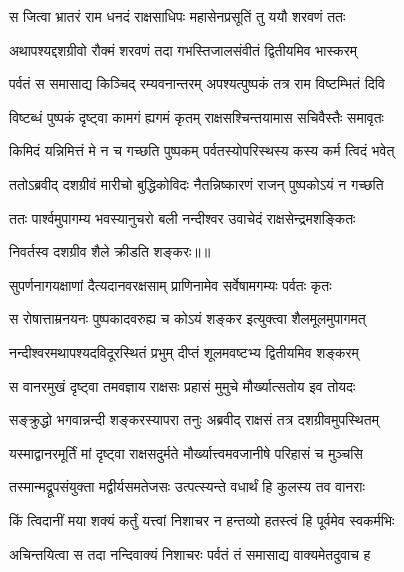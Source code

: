 
\twolineshloka
{स जित्वा भ्रातरं राम धनदं राक्षसाधिपः}
{महासेनप्रसूतिं तु ययौ शरवणं ततः} %

\twolineshloka
{अथापश्यद्दशग्रीवो रौक्मं शरवणं तदा}
{गभस्तिजालसंवीतं द्वितीयमिव भास्करम्} %

\twolineshloka
{पर्वतं स समासाद्य किञ्चिद् रम्यवनान्तरम्}
{अपश्यत्पुष्पकं तत्र राम विष्टम्भितं दिवि} %

\twolineshloka
{विष्टब्धं पुष्पकं दृष्ट्वा कामगं ह्यगमं कृतम्}
{राक्षसश्चिन्तयामास सचिवैस्तैः समावृतः} %

\twolineshloka
{किमिदं यन्निमित्तं मे न च गच्छति पुष्पकम्}
{पर्वतस्योपरिस्थस्य कस्य कर्म त्विदं भवेत्} %

\twolineshloka
{ततोऽब्रवीद् दशग्रीवं मारीचो बुद्धिकोविदः}
{नैतन्निष्कारणं राजन् पुष्पकोऽयं न गच्छति} %

\twolineshloka
{ततः पार्श्वमुपागम्य भवस्यानुचरो बली}
{नन्दीश्वर उवाचेदं राक्षसेन्द्रमशङ्कितः} %

{निवर्तस्व दशग्रीव शैले क्रीडति शङ्करः॥॥} %

\addtocounter{shlokacount}{1}

\twolineshloka
{सुपर्णनागयक्षाणां दैत्यदानवरक्षसाम्}
{प्राणिनामेव सर्वेषामगम्यः पर्वतः कृतः} %

\twolineshloka
{स रोषात्ताम्रनयनः पुष्पकादवरुह्य च}
{कोऽयं शङ्कर इत्युक्त्वा शैलमूलमुपागमत्} %

\twolineshloka
{नन्दीश्वरमथापश्यदविदूरस्थितं प्रभुम्}
{दीप्तं शूलमवष्टभ्य द्वितीयमिव शङ्करम्} %

\twolineshloka
{स वानरमुखं दृष्ट्वा तमवज्ञाय राक्षसः}
{प्रहासं मुमुचे मौर्ख्यात्सतोय इव तोयदः} %

\twolineshloka
{सङ्क्रुद्धो भगवान्नन्दी शङ्करस्यापरा तनुः}
{अब्रवीद् राक्षसं तत्र दशग्रीवमुपस्थितम्} %

\twolineshloka
{यस्माद्वानरमूर्तिं मां दृष्ट्वा राक्षसदुर्मते}
{मौर्ख्यात्त्वमवजानीषे परिहासं च मुञ्चसि} %

\twolineshloka
{तस्मान्मद्रूपसंयुक्ता मद्वीर्यसमतेजसः}
{उत्पत्स्यन्ते वधार्थं हि कुलस्य तव वानराः} %

\twolineshloka
{किं त्विदानीं मया शक्यं कर्तुं यत्त्वां निशाचर}
{न हन्तव्यो हतस्त्वं हि पूर्वमेव स्वकर्मभिः} %

\twolineshloka
{अचिन्तयित्वा स तदा नन्दिवाक्यं निशाचरः}
{पर्वतं तं समासाद्य वाक्यमेतदुवाच ह} %

